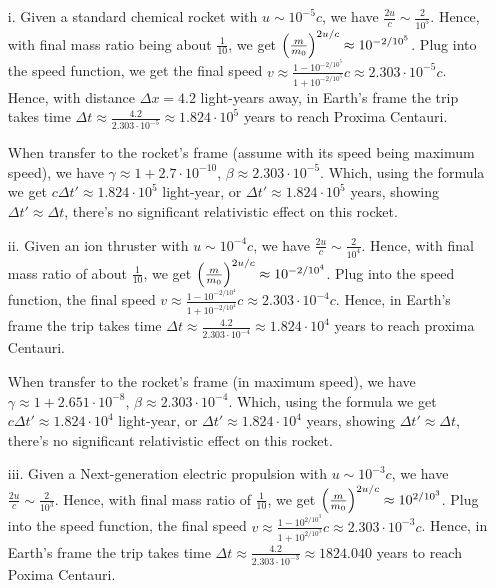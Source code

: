 \documentclass{article}
\DeclarePairedDelimiter{\paran}{(}{)}%
\begin{document}
\begin{itemize}
    \item[i.] Given a standard chemical rocket with $u \sim 10^{-5}c$, we have $\frac{2u}{c}\sim \frac{2}{10^5}$. Hence, with final mass ratio being about $\frac{1}{10}$, we get $\paran*{\frac{m}{m_0}}^{2u/c} \approx 10^{-2/10^5}$. Plug into the speed function, we get the final speed $v\approx \frac{1-10^{-2/10^5}}{1+10^{-2/10^5}}c \approx 2.303\cdot 10^{-5}c$. Hence, with distance $\Delta x=4.2$ light-years away, in Earth's frame the trip takes time $\Delta t\approx \frac{4.2}{2.303\cdot 10^{-5}} \approx 1.824 \cdot 10^5$ years to reach Proxima Centauri.
    
    When transfer to the rocket's frame (assume with its speed being maximum speed), we have $\gamma \approx 1+2.7\cdot 10^{-10}$, $\beta \approx 2.303\cdot 10^{-5}$. Which, using the formula we get $c\Delta t' \approx 1.824\cdot 10^5$ light-year, or $\Delta t'\approx 1.824\cdot 10^5$ years, showing $\Delta t'\approx \Delta t$, there's no significant relativistic effect on this rocket.

    \hfil

    \item[ii.] Given an ion thruster with $u \sim 10^{-4}c$, we have $\frac{2u}{c}\sim \frac{2}{10^4}$. Hence, with final mass ratio of about $\frac{1}{10}$, we get $\paran*{\frac{m}{m_0}}^{2u/c}\approx 10^{-2/10^4}$. Plug into the speed function, the final speed $v \approx \frac{1-10^{-2/10^4}}{1+10^{-2/10^4}}c \approx 2.303\cdot 10^{-4}c$. Hence, in Earth's frame the trip takes time $\Delta t\approx \frac{4.2}{2.303\cdot 10^{-4}}\approx 1.824\cdot 10^4$ years to reach proxima Centauri.
    
    When transfer to the rocket's frame (in maximum speed), we have $\gamma\approx 1+2.651\cdot 10^{-8}$, $\beta\approx 2.303\cdot 10^{-4}$. Which, using the formula we get $c\Delta t' \approx 1.824\cdot 10^4$ light-year, or $\Delta t'\approx 1.824\cdot 10^4$ years, showing $\Delta t'\approx \Delta t$, there's no significant relativistic effect on this rocket.

    \hfil

    \item[iii.] Given a Next-generation electric propulsion with $u\sim 10^{-3}c$, we have $\frac{2u}{c}\sim \frac{2}{10^3}$. Hence, with final mass ratio of $\frac{1}{10}$, we get $\paran*{\frac{m}{m_0}}^{2u/c}\approx 10^{2/10^3}$. Plug into the speed function, the final speed $v\approx \frac{1-10^{2/10^3}}{1+10^{2/10^3}}c \approx 2.303\cdot 10^{-3}c$. Hence, in Earth's frame the trip takes time $\Delta t\approx \frac{4.2}{2.303\cdot 10^{-3}}\approx 1824.040$ years to reach Poxima Centauri.
    

\end{itemize}
\end{document}

